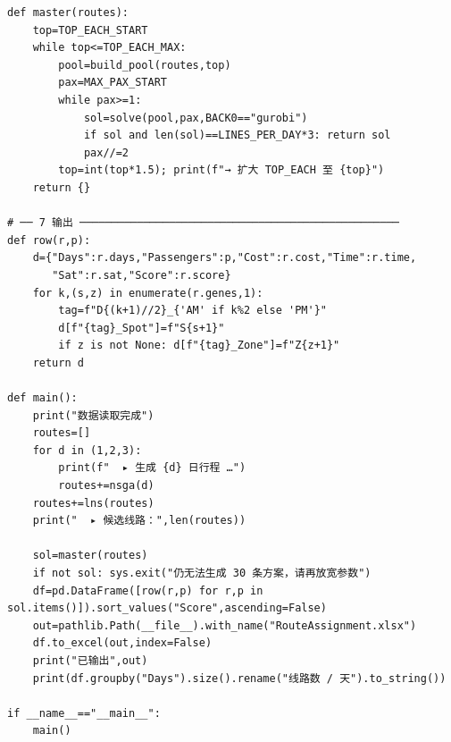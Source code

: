 \documentclass[12pt,a4paper]{article}
\begin{document}
\begin{lstlisting}
def master(routes):
    top=TOP_EACH_START
    while top<=TOP_EACH_MAX:
        pool=build_pool(routes,top)
        pax=MAX_PAX_START
        while pax>=1:
            sol=solve(pool,pax,BACK0=="gurobi")
            if sol and len(sol)==LINES_PER_DAY*3: return sol
            pax//=2
        top=int(top*1.5); print(f"→ 扩大 TOP_EACH 至 {top}")
    return {}

# ── 7 输出 ──────────────────────────────────────────────────
def row(r,p):
    d={"Days":r.days,"Passengers":p,"Cost":r.cost,"Time":r.time,
       "Sat":r.sat,"Score":r.score}
    for k,(s,z) in enumerate(r.genes,1):
        tag=f"D{(k+1)//2}_{'AM' if k%2 else 'PM'}"
        d[f"{tag}_Spot"]=f"S{s+1}"
        if z is not None: d[f"{tag}_Zone"]=f"Z{z+1}"
    return d

def main():
    print("数据读取完成")
    routes=[]
    for d in (1,2,3):
        print(f"  ▸ 生成 {d} 日行程 …")
        routes+=nsga(d)
    routes+=lns(routes)
    print("  ▸ 候选线路：",len(routes))

    sol=master(routes)
    if not sol: sys.exit("仍无法生成 30 条方案，请再放宽参数")
    df=pd.DataFrame([row(r,p) for r,p in sol.items()]).sort_values("Score",ascending=False)
    out=pathlib.Path(__file__).with_name("RouteAssignment.xlsx")
    df.to_excel(out,index=False)
    print("已输出",out)
    print(df.groupby("Days").size().rename("线路数 / 天").to_string())

if __name__=="__main__":
    main()
\end{lstlisting}
\end{document}
